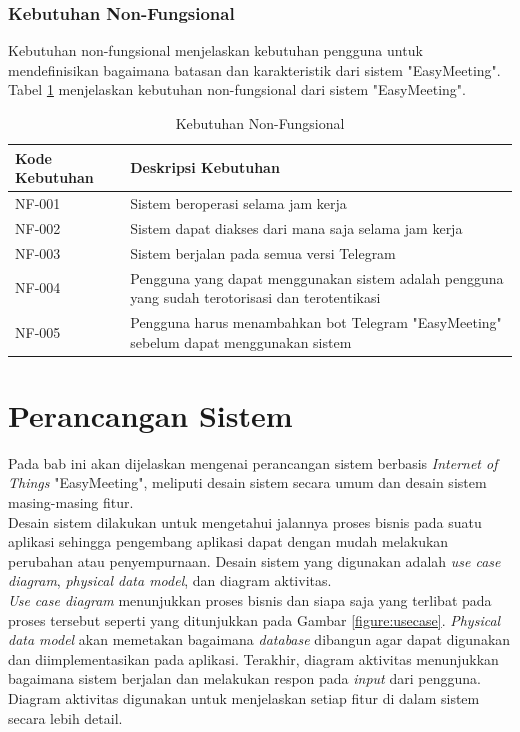\subsubsection{Kebutuhan Non-Fungsional}
\tab Kebutuhan non-fungsional menjelaskan kebutuhan pengguna untuk mendefinisikan bagaimana batasan dan karakteristik dari sistem "EasyMeeting". Tabel \ref{table:kebutuhan_non_fungsional} menjelaskan kebutuhan non-fungsional dari sistem "EasyMeeting".

\begin{table}[H]
	\centering
	\begin{tabular}{ | p{3cm} | p{6cm} | }
		\hline
		\textbf{Kode Kebutuhan} & \textbf{Deskripsi Kebutuhan} \\ \hline
		NF-001 & Sistem beroperasi selama jam kerja \\ \hline
		NF-002 & Sistem dapat diakses dari mana saja selama jam kerja \\ \hline
		NF-003 & Sistem berjalan pada semua versi Telegram \\ \hline
		NF-004 & Pengguna yang dapat menggunakan sistem adalah pengguna yang sudah terotorisasi dan terotentikasi \\ \hline
		NF-005 & Pengguna harus menambahkan bot Telegram "EasyMeeting" sebelum dapat menggunakan sistem \\ \hline
	\end{tabular} \caption{Kebutuhan Non-Fungsional}
	\label{table:kebutuhan_non_fungsional}
\end{table}

\section{Perancangan Sistem}
\tab Pada bab ini akan dijelaskan mengenai perancangan sistem berbasis \textit{Internet of Things} "EasyMeeting", meliputi desain sistem secara umum dan desain sistem masing-masing fitur.\\
\tab Desain sistem dilakukan untuk mengetahui jalannya proses bisnis pada suatu aplikasi sehingga pengembang aplikasi dapat dengan mudah melakukan perubahan atau penyempurnaan. Desain sistem yang digunakan adalah \textit{use case diagram}, \textit{physical data model}, dan diagram aktivitas.\\
\tab \textit{Use case diagram} menunjukkan proses bisnis dan siapa saja yang terlibat pada proses tersebut seperti yang ditunjukkan pada Gambar \ref{figure:usecase}. \textit{Physical data model} akan memetakan bagaimana \textit{database} dibangun agar dapat digunakan dan diimplementasikan pada aplikasi. Terakhir, diagram aktivitas menunjukkan bagaimana sistem berjalan dan melakukan respon pada \textit{input} dari pengguna. Diagram aktivitas digunakan untuk menjelaskan setiap fitur di dalam sistem secara lebih detail.

